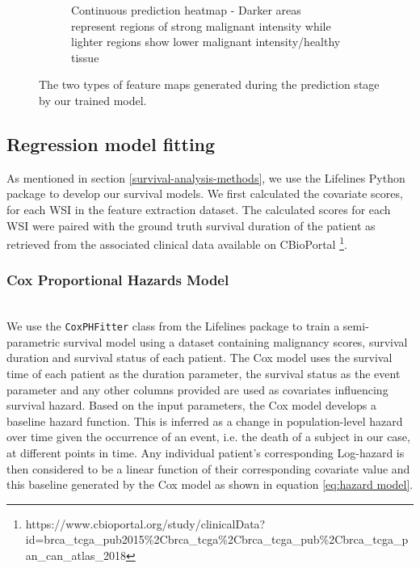 \documentclass{l4proj}
\begin{document}
\begin{figure}[h]
\begin{subfigure}[b]{0.4\textwidth}
        \caption{Continuous prediction heatmap - Darker areas represent regions of strong malignant intensity while lighter regions show lower malignant intensity/healthy tissue}
        \label{fig:continuous-heatmap}
    \end{subfigure}

    \caption{The two types of feature maps generated during the prediction stage by our trained model. }
    \label{fig:visualization-example}
\end{figure}

\subsection{Regression model fitting}
 As mentioned in section \ref{survival-analysis-methods}, we use the Lifelines Python package to develop our survival models. We first calculated the covariate scores, for each WSI in the feature extraction dataset. The calculated scores for each WSI were paired with the ground truth survival duration of the patient as retrieved from the associated clinical data available on CBioPortal \footnote{https://www.cbioportal.org/study/clinicalData?id=brca\_tcga\_pub2015\%2Cbrca\_tcga\%2Cbrca\_tcga\_pub\%2Cbrca\_tcga\_pan\_can\_atlas\_2018}.
\\
 \subsubsection{Cox Proportional Hazards Model}\hfill\\
We use the \texttt{CoxPHFitter} class from the Lifelines package to train a semi-parametric survival model using a dataset containing malignancy scores, survival duration and survival status of each patient. The Cox model uses the survival time of each patient as the duration parameter, the survival status as the event parameter and any other columns provided are used as covariates influencing survival hazard. Based on the input parameters, the Cox model develops a baseline hazard function. This is inferred as a change in population-level hazard over time given the occurrence of an event, i.e. the death of a subject in our case, at different points in time. Any individual patient's corresponding Log-hazard is then considered to be a linear function of their corresponding covariate value and this baseline generated by the Cox model as shown in equation \ref{eq:hazard model}. 
\\
\end{document}
